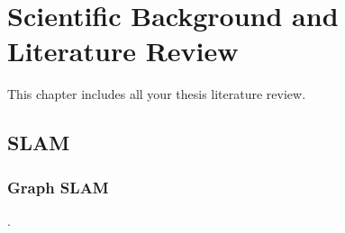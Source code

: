 \chapter{Scientific Background and Literature Review}\label{sec-related-works}


This chapter includes all your thesis literature review.



\section{SLAM}
\label{chapter_2_slam}



\subsection{Graph SLAM}
\label{chapter_2_g_slam}
. 

\label{chapter_2_ba}



\newpage
\renewcommand*{\bibname}{\section{References}}%

		


